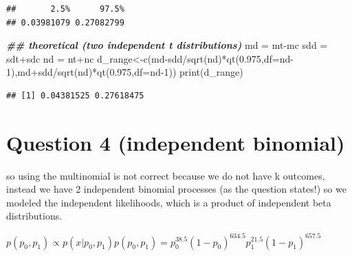 \documentclass[
]{book}
\newenvironment{Shaded}{\begin{snugshade}}{\end{snugshade}}
\newcommand{\AttributeTok}[1]{\textcolor[rgb]{0.77,0.63,0.00}{#1}}
\newcommand{\DecValTok}[1]{\textcolor[rgb]{0.00,0.00,0.81}{#1}}
\newcommand{\DocumentationTok}[1]{\textcolor[rgb]{0.56,0.35,0.01}{\textbf{\textit{#1}}}}
\newcommand{\FloatTok}[1]{\textcolor[rgb]{0.00,0.00,0.81}{#1}}
\newcommand{\FunctionTok}[1]{\textcolor[rgb]{0.00,0.00,0.00}{#1}}
\newcommand{\NormalTok}[1]{#1}
\newcommand{\OtherTok}[1]{\textcolor[rgb]{0.56,0.35,0.01}{#1}}
\newcommand{\SpecialCharTok}[1]{\textcolor[rgb]{0.00,0.00,0.00}{#1}}
\theoremstyle{definition}
\theoremstyle{definition}
\theoremstyle{definition}
\theoremstyle{definition}
\theoremstyle{remark}
\begin{document}
\begin{verbatim}
##       2.5%      97.5% 
## 0.03981079 0.27082799
\end{verbatim}

\begin{Shaded}
\begin{Highlighting}[]
  \DocumentationTok{\#\# theoretical (two independent t distributions)}
\NormalTok{  md }\OtherTok{=}\NormalTok{ mt}\SpecialCharTok{{-}}\NormalTok{mc}
\NormalTok{  sdd }\OtherTok{=}\NormalTok{ sdt}\SpecialCharTok{+}\NormalTok{sdc}
\NormalTok{  nd }\OtherTok{=}\NormalTok{ nt}\SpecialCharTok{+}\NormalTok{nc}
\NormalTok{  d\_range}\OtherTok{\textless{}{-}}\FunctionTok{c}\NormalTok{(md}\SpecialCharTok{{-}}\NormalTok{sdd}\SpecialCharTok{/}\FunctionTok{sqrt}\NormalTok{(nd)}\SpecialCharTok{*}\FunctionTok{qt}\NormalTok{(}\FloatTok{0.975}\NormalTok{,}\AttributeTok{df=}\NormalTok{nd}\DecValTok{{-}1}\NormalTok{),md}\SpecialCharTok{+}\NormalTok{sdd}\SpecialCharTok{/}\FunctionTok{sqrt}\NormalTok{(nd)}\SpecialCharTok{*}\FunctionTok{qt}\NormalTok{(}\FloatTok{0.975}\NormalTok{,}\AttributeTok{df=}\NormalTok{nd}\DecValTok{{-}1}\NormalTok{))}
  \FunctionTok{print}\NormalTok{(d\_range)}
\end{Highlighting}
\end{Shaded}

\begin{verbatim}
## [1] 0.04381525 0.27618475
\end{verbatim}

\hypertarget{question-4-independent-binomial}{%
\section*{Question 4 (independent binomial)}\label{question-4-independent-binomial}}

so using the multinomial is not correct because we do not have k outcomes, instead we have 2 independent binomial processes (as the question states!) so we modeled the independent likelihoods, which is a product of independent beta distributions.

\(p(p_0,p_1) \propto p(x| p_0,p_1)p(p_0,p_1) = p_0^{38.5}(1-p_0)^{634.5}p_1^{21.5}(1-p_1)^{657.5}\)
\end{document}
